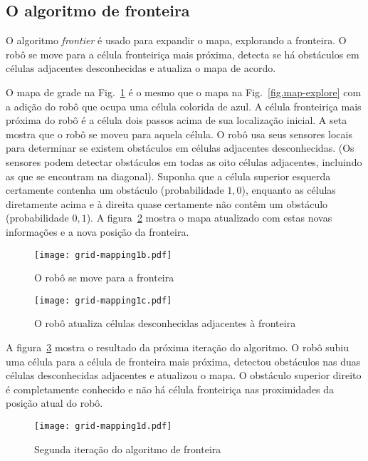 \subsection{O algoritmo de fronteira}

O algoritmo \emph{frontier} é usado para expandir o mapa, explorando a fronteira. O robô se move para a célula fronteiriça mais próxima, detecta se há obstáculos em células adjacentes desconhecidas e atualiza o mapa de acordo. 

O mapa de grade na Fig.~\ref{fig.map-explore1} é o mesmo que o mapa na Fig.~\ref{fig.map-explore} com a adição do robô que ocupa uma célula colorida de azul. A célula fronteiriça mais próxima do robô é a célula dois passos acima de sua localização inicial. A seta mostra que o robô se moveu para aquela célula. O robô usa seus sensores locais para determinar se existem obstáculos em células adjacentes desconhecidas. (Os sensores podem detectar obstáculos em todas as oito células adjacentes, incluindo as que se encontram na diagonal). Suponha que a célula superior esquerda certamente contenha um obstáculo (probabilidade $1,0$), enquanto as células diretamente acima e à direita quase certamente não contêm um obstáculo (probabilidade $0,1$). A figura~\ref{fig.map-explore2} mostra o mapa atualizado com estas novas informações e a nova posição da fronteira.


\begin{figure}
\begin{center}
\texttt{[image: grid-mapping1b.pdf]}
\end{center}
\caption{O robô se move para a fronteira}\label{fig.map-explore1}
\end{figure}

\begin{figure}
\begin{center}
\texttt{[image: grid-mapping1c.pdf]}
\end{center}
\caption{O robô atualiza células desconhecidas adjacentes à fronteira}\label{fig.map-explore2}
\end{figure}

A figura~\ref{fig.map-explore3} mostra o resultado da próxima iteração do algoritmo. O robô subiu uma célula para a célula de fronteira mais próxima, detectou obstáculos nas duas células desconhecidas adjacentes e atualizou o mapa. O obstáculo superior direito é completamente conhecido e não há célula fronteiriça nas proximidades da posição atual do robô.

\begin{figure}
\begin{center}
\texttt{[image: grid-mapping1d.pdf]}
\end{center}
\caption{Segunda iteração do algoritmo de fronteira}\label{fig.map-explore3}
\end{figure}

